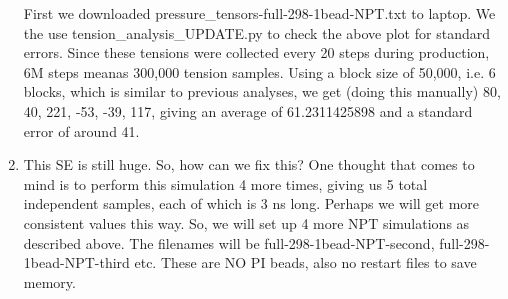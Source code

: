 \documentclass[12pt,reqno]{amsart}
\numberwithin{equation}{section}
\begin{document}
\begin{enumerate}
First we downloaded pressure\_tensors-full-298-1bead-NPT.txt to laptop.  We the use tension\_analysis\_UPDATE.py to check the above plot for standard errors.  Since these tensions were collected every 20 steps during production, 6M steps meanas 300,000 tension samples.  Using a block size of 50,000, i.e. 6 blocks, which is similar to previous analyses, we get (doing this manually) 80, 40, 221, -53, -39, 117, giving an average of 61.2311425898 and a standard error of around 41.  
\item This SE is still huge.  So, how can we fix this?  One thought that comes to mind is to perform this simulation 4 more times, giving us 5 total independent samples, each of which is 3 ns long.  Perhaps we will get more consistent values this way.  So, we will set up 4 more NPT simulations as described above.  The filenames will be full-298-1bead-NPT-second, full-298-1bead-NPT-third etc.  These are NO PI beads, also no restart files to save memory.  

\end{enumerate}
\end{document}
